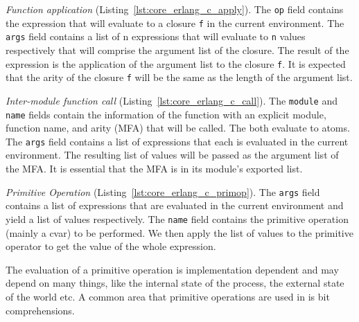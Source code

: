 
\emph{Function application} (Listing~\ref{lst:core_erlang_c_apply}).
The \texttt{op} field contains the expression that will evaluate to a closure \texttt{f} in the
current environment. The \texttt{args} field contains a list of n expressions that will
evaluate to \texttt{n} values respectively that will comprise the argument list of the
closure. The result of the expression is the application of the argument list
to the closure \texttt{f}. It is expected that the arity of the closure \texttt{f} will be the
same as the length of the argument list.



\emph{Inter-module function call} (Listing~\ref{lst:core_erlang_c_call}).
The \texttt{module} and \texttt{name} fields contain the information of the function with an
explicit module, function name, and arity (MFA) that will be called. The both
evaluate to atoms. The \texttt{args} field contains a list of expressions that each is
evaluated in the current environment. The resulting list of values will be
passed as the argument list of the MFA. It is essential that the MFA is in its
module’s exported list.



\emph{Primitive Operation} (Listing~\ref{lst:core_erlang_c_primop}).
The \texttt{args} field contains a list of expressions that are evaluated in the current
environment and yield a list of values respectively. The \texttt{name} field contains
the primitive operation (mainly a c\textunderscore var) to be performed. We then apply the
list of values to the primitive operator to get the value of the whole
expression.

The evaluation of a primitive operation is implementation dependent and may
depend on many things, like the internal state of the process, the external
state of the world etc. A common area that primitive operations are used in is
bit comprehensions.


